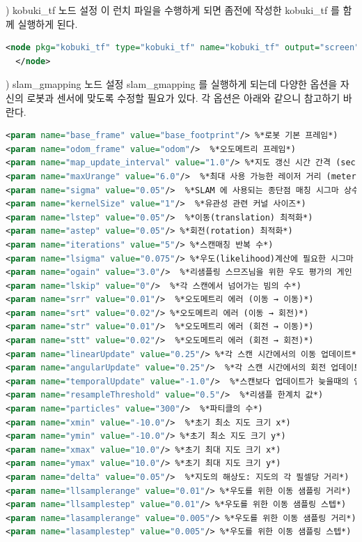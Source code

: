 \vspace{\baselineskip}
\noindent
{}) kobuki\_tf 노드 설정
이 런치 파일을 수행하게 되면 좀전에 작성한 kobuki\_tf 를 함께 실행하게 된다.

\vspace{\baselineskip}
\begin{lstlisting}[language=XML]
  <node pkg="kobuki_tf" type="kobuki_tf" name="kobuki_tf" output="screen">
  </node>
\end{lstlisting}

\vspace{\baselineskip}
\noindent
{}) slam\_gmapping 노드 설정
slam\_gmapping 를 실행하게 되는데 다양한 옵션을 자신의 로봇과 센서에 맞도록 수정할 필요가 있다. 각 옵션은 아래와 같으니 참고하기 바란다.

\vspace{\baselineskip}
\begin{lstlisting}[language=XML]
<param name="base_frame" value="base_footprint"/> %*로봇 기본 프레임*)
<param name="odom_frame" value="odom"/>  %*오도메트리 프레임*)
<param name="map_update_interval" value="1.0"/> %*지도 갱신 시간 간격 (sec)*)
<param name="maxUrange" value="6.0"/>  %*최대 사용 가능한 레이저 거리 (meter)*)
<param name="sigma" value="0.05"/>  %*SLAM 에 사용되는 종단점 매칭 시그마 상수 값*)
<param name="kernelSize" value="1"/>  %*유관성 관련 커널 사이즈*)
<param name="lstep" value="0.05"/>  %*이동(translation) 최적화*)
<param name="astep" value="0.05"/> %*회전(rotation) 최적화*)
<param name="iterations" value="5"/> %*스캔매칭 반복 수*)
<param name="lsigma" value="0.075"/> %*우도(likelihood)계산에 필요한 시그마 값*)
<param name="ogain" value="3.0"/>  %*리샘플링 스므즈님을 위한 우도 평가의 게인 값*)
<param name="lskip" value="0"/>  %*각 스캔에서 넘어가는 빔의 수*)
<param name="srr" value="0.01"/>  %*오도메트리 에러 (이동 → 이동)*)
<param name="srt" value="0.02"/> %*오도메트리 에러 (이동 → 회전)*)
<param name="str" value="0.01"/>  %*오도메트리 에러 (회전 → 이동)*)
<param name="stt" value="0.02"/>  %*오도메트리 에러 (회전 → 회전)*)
<param name="linearUpdate" value="0.25"/> %*각 스캔 시간에서의 이동 업데이트*)
<param name="angularUpdate" value="0.25"/>  %*각 스캔 시간에서의 회전 업데이트*)
<param name="temporalUpdate" value="-1.0"/>  %*스캔보다 업데이트가 늦을때의 업데이트*)
<param name="resampleThreshold" value="0.5"/>  %*리샘플 한계치 값*)
<param name="particles" value="300"/>  %*파티클의 수*)
<param name="xmin" value="-10.0"/>  %*초기 최소 지도 크기 x*)
<param name="ymin" value="-10.0"/> %*초기 최소 지도 크기 y*)
<param name="xmax" value="10.0"/> %*초기 최대 지도 크기 x*)
<param name="ymax" value="10.0"/> %*초기 최대 지도 크기 y*)
<param name="delta" value="0.05"/>  %*지도의 해상도: 지도의 각 필셀당 거리*)
<param name="llsamplerange" value="0.01"/> %*우도를 위한 이동 샘플링 거리*)
<param name="llsamplestep" value="0.01"/> %*우도를 위한 이동 샘플링 스텝*)
<param name="lasamplerange" value="0.005"/> %*우도를 위한 이동 샘플링 거리*)
<param name="lasamplestep" value="0.005"/> %*우도를 위한 이동 샘플링 스텝*)
\end{lstlisting}


